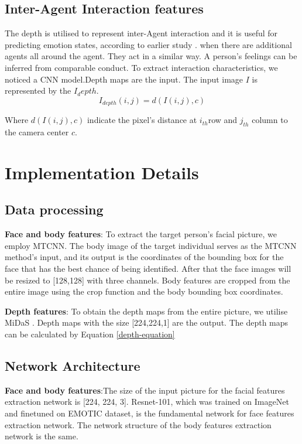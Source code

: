 \documentclass[conference]{IEEEtran}
\begin{document}
\subsection{Inter-Agent Interaction features }
The depth is utilised to represent inter-Agent interaction and it is useful for predicting emotion states, according to earlier study \cite{ref-21}. when there are additional agents all around the agent. They act in a similar way. A person's feelings can be inferred from comparable conduct. To extract interaction characteristics, we noticed a CNN model.Depth maps are the input. The input image $I$ is represented by the $I_depth$. 
\begin{equation}
I_{depth}(i,j) =  d(I(i,j),c)
  \label{depth-equation}
\end{equation}

Where  $d(I(i,j),c)$ indicate the pixel's distance at $ i_{th} $row and $ j_{th} $ column to the camera center $c$. 

\section{Implementation Details}
\subsection{ Data processing}

\textbf{Face and body features}: To extract the target person's facial picture, we employ MTCNN. The body image of the target individual serves as the MTCNN method's input, and its output is the coordinates of the bounding box for the face that has the best chance of being identified. After that the face images will be resized to [128,128] with three channels. Body features are cropped from the entire image using the crop function and the body bounding box coordinates.

\textbf{Depth features}: To obtain the depth maps from the entire picture, we utilise MiDaS \cite{ref-30}. Depth maps with the size [224,224,1] are the output. The depth maps can be calculated by Equation \ref{depth-equation}

\subsection{Network Architecture}

\textbf{Face and body features}:The size of the input picture for the facial features extraction network is [224, 224, 3]. Resnet-101, which was trained on ImageNet and finetuned on EMOTIC dataset, is the fundamental network for face features extraction network. The network structure of the body features extraction network is the same.
\end{document}
